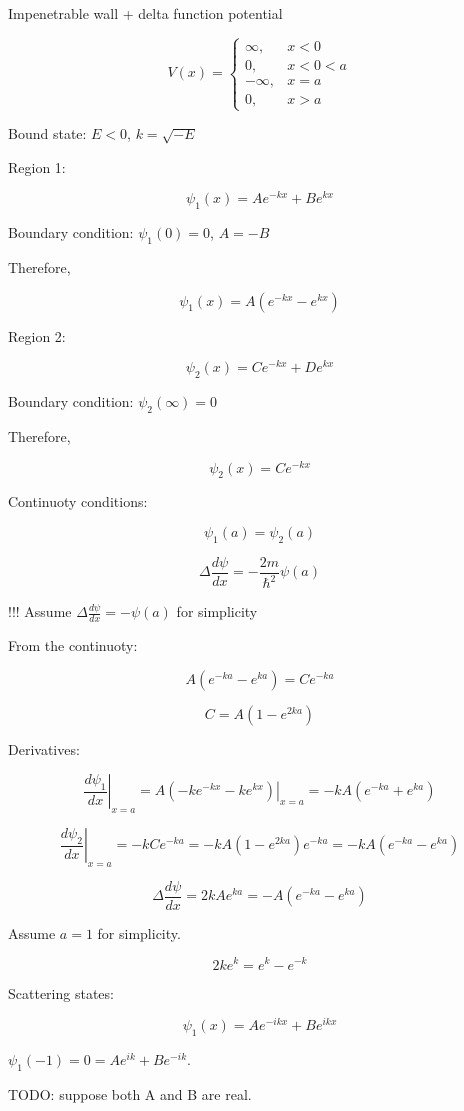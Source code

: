 \documentclass[12pt, a4paper]{article}
\begin{document}
Impenetrable wall + delta function potential

$$V(x) = \begin{cases}
\infty, & x < 0 \\
0, & x < 0 < a \\
-\infty, & x = a \\
0, & x > a
\end{cases}$$

Bound state: $E < 0$, $k = \sqrt{-E}$

Region 1:

$$\psi_1(x) = A e^{-kx} + B e^{kx}$$

Boundary condition: $\psi_1(0) = 0$, $A = -B$

Therefore,

$$\psi_1(x) = A(e^{-kx} - e^{kx})$$

Region 2:

$$\psi_2(x) = C e^{-kx} + D e^{kx}$$

Boundary condition: $\psi_2(\infty) = 0$

Therefore,

$$\psi_2(x) = C e^{-kx}$$

Continuoty conditions:

$$\psi_1(a) = \psi_2(a)$$

$$\Delta \frac{d \psi}{d x} = - \frac{2m}{\hbar^2}\psi(a)$$

!!! Assume $\Delta \frac{d \psi}{d x} = - \psi(a)$ for simplicity

From the continuoty:

$$A(e^{-ka} - e^{ka}) = C e^{-ka}$$

$$C = A(1 - e^{2ka})$$

Derivatives:

$$ \left. \frac{d \psi_1}{dx} \right|_{x = a} = \left. A (-k e^{-kx} - k e^{kx}) \right|_{x = a} = -kA(e^{-ka} + e^{ka})$$

$$ \left. \frac{d \psi_2}{dx} \right|_{x = a} = -k C e^{-ka} = -k A(1 - e^{2ka}) e^{-ka} = -k A(e^{-ka} - e^{ka})$$

$$ \Delta \frac{d \psi}{dx} = 2 k A e^{ka} = -A(e^{-ka} - e^{ka})$$

Assume $a = 1$ for simplicity.

$$2k e^k = e^k - e^{-k}$$

Scattering states:

$$\psi_1(x) = A e^{-ikx} + B e^{ikx}$$

$\psi_1(-1) = 0 = A e^{ik} + B e^{-ik}$. 

TODO: suppose both A and B are real. 
\end{document}

